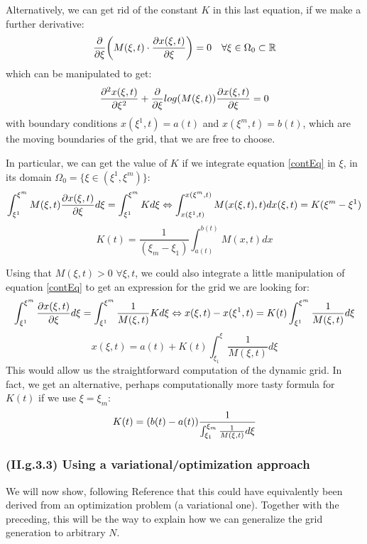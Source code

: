 \documentclass[11pt, a4paper]{article} %
\newcommand{\R}{\mathbb{R}} %
\begin{document}
Alternatively, we can get rid of the constant $K$ in this last equation, if we make a further derivative:
\begin{equation}\label{EL1D}
\pdv{}{\xi}\qty(M(\xi,t)\cdot \pdv{x(\xi,t)}{\xi})=0 \quad \forall \xi\in \Omega_0\subset \R
\end{equation}
which can be manipulated to get:
\begin{equation}
\pdv[2]{x(\xi,t)}{\xi}+\pdv{}{\xi}log(M(\xi,t))\pdv{x(\xi,t)}{\xi}=0
\end{equation}
with boundary conditions $x(\xi^1,t)=a(t)$ and $x(\xi^m,t)=b(t)$, which are the moving boundaries of the grid, that we are free to choose.

In particular, we can get the value of $K$ if we integrate equation \eqref{contEq} in $\xi$, in its domain $\Omega_0=\{\xi\in(\xi^1,\xi^m)\}$:
\begin{equation}
\int^{\xi^m}_{\xi^1} M(\xi,t) \pdv{x(\xi,t)}{\xi} d\xi=\int^{\xi^m}_{\xi^1} K d \xi  \Leftrightarrow \int^{x(\xi^m,t)}_{x(\xi^1,t)} M(x(\xi,t),t) dx(\xi,t)=K(\xi^m-\xi^1)
\end{equation}
\begin{equation}
K(t)=\frac{1}{(\xi_m-\xi_1)}\int^{b(t)}_{a(t)} M(x,t) dx
\end{equation}

Using that $M(\xi,t)>0$ $\forall \xi,t$, we could also integrate a little manipulation of equation \eqref{contEq} to get an expression for the grid we are looking for:
\begin{equation}
\int^{\xi^m}_{\xi^1}  \pdv{x(\xi,t)}{\xi} d\xi=\int^{\xi^m}_{\xi^1} \frac{1}{M(\xi,t)} K d \xi  \Leftrightarrow x(\xi,t)-x(\xi^1,t) =K(t)\int^{\xi^m}_{\xi^1} \frac{1}{M(\xi,t)}  d \xi
\end{equation}
\begin{equation}
x(\xi,t)=a(t)+K(t)\int^\xi_{\xi_1} \frac{1}{M(\xi,t)}d\xi
\end{equation}
This would allow us the straightforward computation of the dynamic grid. In fact, we get an alternative, perhaps computationally more tasty formula for $K(t)$ if we use $\xi=\xi_m$:
\begin{equation}
K(t)=(b(t)-a(t))\frac{1}{\int^{\xi_m}_{\xi_1} \frac{1}{M(\xi,t)}d\xi}\vspace{-0.2cm}
\end{equation}

\subsubsection*{\bf (II.g.3.3) Using a variational/optimization approach}
We will now show, following Reference \cite{movingGrids} that this could have equivalently been derived from an optimization problem (a variational one). Together with the preceding, this will be the way to explain how we can generalize the grid generation to arbitrary $N$.
\end{document}
